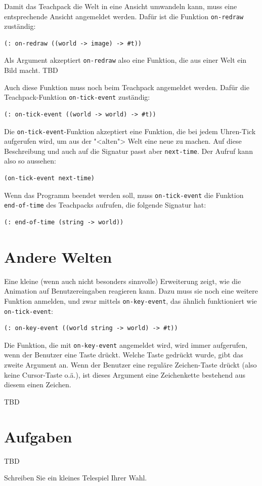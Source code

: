 Damit das Teachpack die Welt in eine Ansicht umwandeln kann, muss eine
entsprechende Ansicht angemeldet werden.  Dafür ist die Funktion
\texttt{on-redraw} zuständig:
%
\begin{lstlisting}
(: on-redraw ((world -> image) -> #t))
\end{lstlisting}
%
Als Argument akzeptiert \texttt{on-redraw} also eine Funktion, die aus
einer Welt ein Bild macht.  TBD

Auch diese Funktion muss noch beim Teachpack angemeldet werden.  Dafür
die Teachpack-Funktion
\texttt{on-tick-event}
zuständig:
%
\begin{lstlisting}
(: on-tick-event ((world -> world) -> #t))
\end{lstlisting}
%
Die \texttt{on-tick-event}-Funktion akzeptiert eine Funktion, die bei
jedem Uhren-Tick aufgerufen wird, um aus der "<alten"> Welt eine neue
zu machen.  Auf diese Beschreibung und auch auf die Signatur
passt aber \texttt{next-time}.  Der Aufruf kann also so aussehen:
%
\begin{lstlisting}
(on-tick-event next-time)
\end{lstlisting}
%
Wenn das Programm
beendet werden soll, muss \texttt{on-tick-event} die Funktion
\texttt{end-of-time} des
Teachpacks aufrufen, die folgende Signatur hat:
%
\begin{lstlisting}
(: end-of-time (string -> world))
\end{lstlisting}
%

\section{Andere Welten}

Eine kleine (wenn auch nicht besonders sinnvolle) Erweiterung zeigt,
wie die Animation auf Benutzereingaben reagieren kann.  Dazu muss sie
noch eine weitere Funktion anmelden, und zwar mittels
\texttt{on-key-event}, das
ähnlich funktioniert wie \texttt{on-tick-event}:
%
\begin{lstlisting}
(: on-key-event ((world string -> world) -> #t))
\end{lstlisting}
%
Die Funktion, die mit \texttt{on-key-event} angemeldet wird, wird
immer aufgerufen, wenn der Benutzer eine Taste drückt.  Welche Taste
gedrückt wurde, gibt das zweite Argument 
an.  Wenn der Benutzer eine reguläre Zeichen-Taste drückt (also keine
Cursor-Taste o.ä.), ist dieses Argument eine Zeichenkette bestehend
aus diesem einen Zeichen.

TBD

\section*{Aufgaben}

TBD

\begin{aufgabe}
  Schreiben Sie ein kleines Telespiel Ihrer Wahl.
\end{aufgabe}


